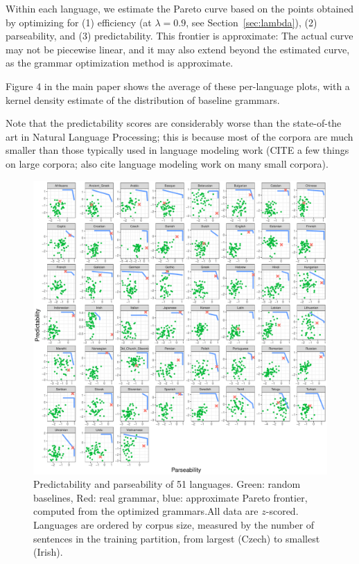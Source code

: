 \documentclass[10pt,twoside,lineno]{article}
\begin{document}
Within each language, we estimate the Pareto curve based on the points obtained by optimizing for (1) efficiency (at $\lambda = 0.9$, see Section~\ref{sec:lambda}), (2) parseability, and (3) predictability.
This frontier is approximate:
The actual curve may not be piecewise linear, and it may also extend beyond the estimated curve, as the grammar optimization method is approximate.

Figure 4 in the main paper shows the average of these per-language plots, with a kernel density estimate of the distribution of baseline grammars. 



Note that the predictability scores are considerably worse than the state-of-the art in Natural Language Processing; this is because most of the corpora are much smaller than those typically used in language modeling work (CITE a few things on large corpora; also cite language modeling work on many small corpora).




\begin{figure}
\centering
\includegraphics[width=\textwidth]{../results/plane/pareto-plane-perLanguage.pdf}
	\caption[Predictability and Parseability]{Predictability and parseability of 51 languages. Green: random baselines, Red: real grammar, blue: approximate Pareto frontier, computed from the optimized grammars.\footnotemark All data are $z$-scored. Languages are ordered by corpus size, measured by the number of sentences in the training partition, from largest (Czech) to smallest (Irish).}\label{fig:pareto-per-lang}
\end{figure}
\end{document}
